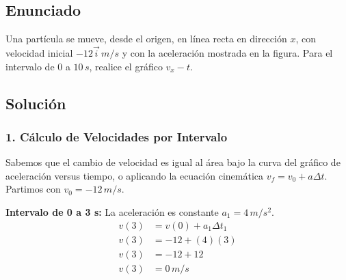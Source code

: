 \documentclass[12pt, a4paper]{article}
\begin{document}
\newpage

\subsection*{Enunciado}
Una partícula se mueve, desde el origen, en línea recta en dirección $x$, con velocidad inicial $-12\vec{i} \, \si{m/s}$ y con la aceleración mostrada en la figura. Para el intervalo de $0$ a $10 \, \si{s}$, realice el gráfico $v_x - t$.

\begin{center}
\end{center}

\subsection*{Solución}

\subsubsection*{1. Cálculo de Velocidades por Intervalo}
Sabemos que el cambio de velocidad es igual al área bajo la curva del gráfico de aceleración versus tiempo, o aplicando la ecuación cinemática $v_f = v_0 + a \Delta t$. Partimos con $v_0 = -12 \, \si{m/s}$.

\textbf{Intervalo de 0 a 3 s:}
La aceleración es constante $a_1 = 4 \, \si{m/s^2}$.
\begin{align*}
v(3) &= v(0) + a_1 \Delta t_1 \\
v(3) &= -12 + (4)(3) \\
v(3) &= -12 + 12 \\
v(3) &= 0 \, \si{m/s}
\end{align*}
\end{document}
